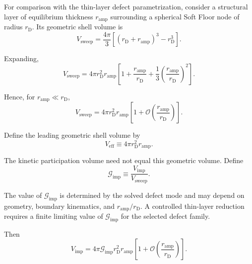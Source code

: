 For comparison with the thin-layer defect parametrization, consider a structural layer of equilibrium thickness $r_{\mathrm{amp}}$ surrounding a spherical Soft Floor node of radius $r_{\mathrm{D}}$. Its geometric shell volume is
\begin{equation}
    V_{\mathrm{sweep}}
    =
    \frac{4\pi}{3}
    \left[
        (r_{\mathrm{D}}+r_{\mathrm{amp}})^3
        -
        r_{\mathrm{D}}^3
    \right].
\end{equation}

Expanding,
\begin{equation}
    V_{\mathrm{sweep}}
    =
    4\pi r_{\mathrm{D}}^2 r_{\mathrm{amp}}
    \left[
        1
        +
        \frac{r_{\mathrm{amp}}}{r_{\mathrm{D}}}
        +
        \frac{1}{3}
        \left(
            \frac{r_{\mathrm{amp}}}{r_{\mathrm{D}}}
        \right)^2
    \right].
\end{equation}

Hence, for $r_{\mathrm{amp}}\ll r_{\mathrm{D}}$,
\begin{equation}
    V_{\mathrm{sweep}}
    =
    4\pi r_{\mathrm{D}}^2 r_{\mathrm{amp}}
    \left[
        1
        +
        \mathcal{O}
        \left(
            \frac{r_{\mathrm{amp}}}{r_{\mathrm{D}}}
        \right)
    \right].
\end{equation}

Define the leading geometric shell volume by
\begin{equation}
    V_{\mathrm{eff}}
    \equiv
    4\pi r_{\mathrm{D}}^2 r_{\mathrm{amp}}.
\end{equation}

The kinetic participation volume need not equal this geometric volume. Define
\begin{equation}
    \mathcal{G}_{\mathrm{imp}}
    \equiv
    \frac{V_{\mathrm{imp}}}{V_{\mathrm{sweep}}}.
\end{equation}

The value of $\mathcal{G}_{\mathrm{imp}}$ is determined by the solved defect mode and may depend on geometry, boundary kinematics, and $r_{\mathrm{amp}}/r_{\mathrm{D}}$. A controlled thin-layer reduction requires a finite limiting value of $\mathcal{G}_{\mathrm{imp}}$ for the selected defect family.

Then
\begin{equation}
    V_{\mathrm{imp}}
    =
    4\pi
    \mathcal{G}_{\mathrm{imp}}
    r_{\mathrm{D}}^2
    r_{\mathrm{amp}}
    \left[
        1
        +
        \mathcal{O}
        \left(
            \frac{r_{\mathrm{amp}}}{r_{\mathrm{D}}}
        \right)
    \right].
\end{equation}

